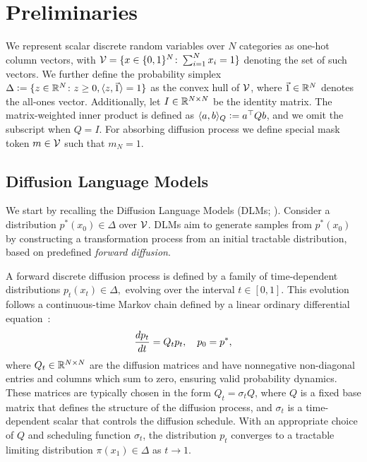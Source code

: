 \vspace{-5mm}
\section{Preliminaries}
\vspace{-2mm}
  We represent scalar discrete random variables over $N$ categories as one-hot column vectors, with ${\mathcal{V} = \{x \in \{0,1\}^N \colon \sum_{i=1}^N x_i = 1\}}$ denoting the set of such vectors. We further define the probability simplex $\Delta \vcentcolon= \{ z \in \mathbb{R}^N\colon z \ge 0, \langle z, \vec{1} \rangle = 1 \}$ as the convex hull of $\mathcal{V}$, where $\vec{1} \in \mathbb{R}^N$ denotes the all-ones vector. Additionally, let $I \in \mathbb{R}^{N \times N}$ be the identity matrix. The matrix-weighted inner product is defined as $\langle a, b \rangle_Q \vcentcolon= a^\top Q b$, and we omit the subscript when $Q = I$. For absorbing diffusion process we define special mask token $m \in \mathcal{V}$ such that $m_N = 1$.

\vspace{-2mm}
\subsection{Diffusion Language Models}
\label{sec:discrete diffusion models}
\vspace{-2mm}
  We start by recalling the Diffusion Language Models (DLMs; \citealp{austin2021structured, campbell2022continuous, lou2024discrete}). Consider a distribution $p^*(x_0) \in \Delta$ over $\mathcal{V}$. DLMs aim to generate samples from $p^*(x_0)$ by constructing a transformation process from an initial tractable distribution, based on predefined \textit{forward diffusion}.

  A forward discrete diffusion process is defined by a family of time-dependent distributions $p_t(x_t) \in \Delta,$ evolving over the interval $t \in [0, 1].$ This evolution follows a continuous-time Markov chain defined by a linear ordinary differential equation~\citep{anderson2012continuous, campbell2022continuous, lou2024discrete}:
\vspace{-1mm}
  \begin{equation}
    \frac{dp_t}{dt} = Q_t p_t, \quad p_0 = p^*,
  \label{eq:forward diffusion}
    \vspace{-0.5mm}
  \end{equation}
  where $Q_t \in \mathbb{R}^{N \times N}$ are the diffusion matrices and have nonnegative non-diagonal entries and columns which sum to zero, ensuring valid probability dynamics. These matrices are typically chosen in the form $Q_t = \sigma_t Q$, where $Q$ is a fixed base matrix that defines the structure of the diffusion process, and $\sigma_t$ is a time-dependent scalar that controls the diffusion schedule. With an appropriate choice of $Q$ and scheduling function $\sigma_t$, the distribution $p_t$ converges to a tractable limiting distribution $\pi(x_1) \in \Delta$ as $t \to 1$.

